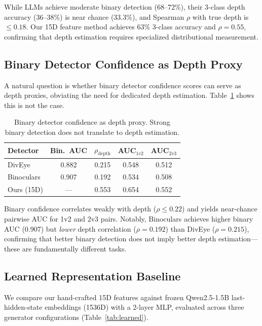 \documentclass[11pt,a4paper]{article}
\begin{document}
While LLMs achieve moderate binary detection (68--72\%), their 3-class depth accuracy (36--38\%) is near chance (33.3\%), and Spearman $\rho$ with true depth is $\leq 0.18$.
Our 15D feature method achieves 63\% 3-class accuracy and $\rho = 0.55$, confirming that depth estimation requires specialized distributional measurement.

\subsection{Binary Detector Confidence as Depth Proxy}
\label{sec:binary-proxy}

A natural question is whether binary detector confidence scores can serve as depth proxies, obviating the need for dedicated depth estimation.
Table~\ref{tab:binary-proxy} shows this is not the case.

\begin{table}[t]
\centering
\small
\caption{Binary detector confidence as depth proxy. Strong binary detection does not translate to depth estimation.}
\label{tab:binary-proxy}
\begin{tabular}{lcccc}
\toprule
\textbf{Detector} & \textbf{Bin.\ AUC} & $\rho_{\mathrm{depth}}$ & \textbf{AUC}$_{1v2}$ & \textbf{AUC}$_{2v3}$ \\
\midrule
DivEye & 0.882 & 0.215 & 0.548 & 0.512 \\
Binoculars & 0.907 & 0.192 & 0.534 & 0.508 \\
\midrule
Ours (15D) & --- & 0.553 & 0.654 & 0.552 \\
\bottomrule
\end{tabular}
\end{table}

Binary confidence correlates weakly with depth ($\rho \leq 0.22$) and yields near-chance pairwise AUC for 1v2 and 2v3 pairs.
Notably, Binoculars achieves higher binary AUC (0.907) but \emph{lower} depth correlation ($\rho = 0.192$) than DivEye ($\rho = 0.215$), confirming that better binary detection does not imply better depth estimation---these are fundamentally different tasks.

\subsection{Learned Representation Baseline}
\label{sec:learned}

We compare our hand-crafted 15D features against frozen Qwen2.5-1.5B last-hidden-state embeddings (1536D) with a 2-layer MLP, evaluated across three generator configurations (Table~\ref{tab:learned}).
\end{document}

